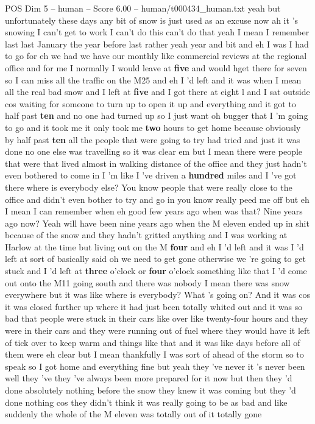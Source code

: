 \begin{textsample}{POS Dim 5 – human – Score 6.00 – human/t000434\_human.txt}  \label{ex:f5_pos_003}
yeah but unfortunately these days any bit of snow is just used as an excuse now ah it 's snowing I can't get to work I can't do this can't do that yeah I mean I remember last last January the year before last rather yeah year and bit and eh I was I had to go for eh we had we have our monthly like commercial reviews at the regional office and for me I normally I would leave at \textbf{five} and would hget there for seven so I can miss all the traffic on the M25 and eh I 'd left and it was when I mean all the real bad snow and I left at \textbf{five} and I got there at eight l and I sat outside cos waiting for someone to turn up to open it up and everything and it got to half past \textbf{ten} and no one had turned up so I just want oh bugger that I 'm going to go and it took me it only took me \textbf{two} hours to get home because obviously by half past \textbf{ten} all the people that were going to try had tried and just it was done no one else was travelling so it was clear em but I mean there were people that were that lived almost in walking distance of the office and they just hadn't even bothered to come in I 'm like I 've driven a \textbf{hundred} miles and I 've got there where is everybody else?
You know people that were really close to the office and didn't even bother to try and go in you know really peed me off but eh I mean I can remember when eh good few years ago when was that?
Nine years ago now?
Yeah will have been nine years ago when the M eleven ended up in shit because of the snow and they hadn't gritted anything and I was working at Harlow at the time but living out on the M \textbf{four} and eh I 'd left and it was I 'd left at sort of basically said oh we need to get gone otherwise we 're going to get stuck and I 'd left at \textbf{three} o'clock or \textbf{four} o'clock something like that I 'd come out onto the M11 going south and there was nobody I mean there was snow everywhere but it was like where is everybody?
What 's going on?
And it was cos it was closed further up where it had just been totally whited out and it was so bad that people were stuck in their cars like over like twenty-four hours and they were in their cars and they were running out of fuel where they would have it left of tick over to keep warm and things like that and it was like days before all of them were eh clear but I mean thankfully I was sort of ahead of the storm so to speak so I got home and everything fine but yeah they 've never it 's never been well they 've they 've always been more prepared for it now but then they 'd done absolutely nothing before the snow they knew it was coming but they 'd done nothing cos they didn't think it was really going to be as bad and like suddenly the whole of the M eleven was totally out of it totally gone

\end{textsample}
